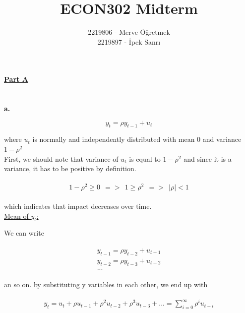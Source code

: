 \documentclass{article}
\title{ECON302 Midterm}
\author{2219806 - Merve Öğretmek \\
2219897 - İpek Sanrı}
\begin{document}
\maketitle

\Large
\underline{\textbf{Part A}}
\small

\setcounter{section}{1}

\section{}

\textbf{a.}

\begin{equation}
    y_t = \rho y_{t-1} + u_t  
\end{equation}

where $u_t$ is normally and independently distributed with mean 0 and variance $1-\rho^2$
\\

First, we should note that variance of $u_t$ is equal to $1-\rho^2$ and since it is a variance, it has to be positive by definition.

\begin{align}
    \begin{split}
        1 - \rho^2 \geq 0 \ \ =>\ \ 1 \geq \rho^2 \ \ =>\ \ |\rho| < 1
    \end{split}
\end{align}

which indicates that impact decreases over time.
\\

\underline{Mean of $y_t$:}

We can write 

\begin{align}
    \begin{split}
        y_{t-1} = \rho y_{t-2} + u_{t-1} \\
        y_{t-2} = \rho y_{t-3} + u_{t-2} \\
        ...
    \end{split}
\end{align} 

an so on. by substituting y variables in each other, we end up with

\begin{align}
    \begin{split}
         y_t = u_t + \rho u_{t-1} + \rho^2 u_{t-2} + \rho^3  u_{t-3} + ... = \sum_{i=0}^\infty \rho^{i} u_{t-i}
    \end{split}
\end{align}
\end{document}
